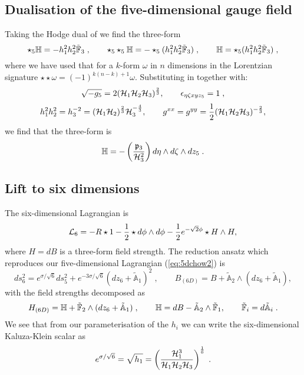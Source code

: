 \subsection*{Dualisation of the five-dimensional gauge field}
Taking the Hodge dual of  we find the three-form
\begin{equation*}
        \star_5 \mathbb{H} = - h^2_1 h^2_2 \tilde{\mathbb F}_3 \;,\qquad
        \star_5 \star_5 \mathbb{H} = - \star_5(h^2_1 h^2_2 \tilde{\mathbb F}_3) \;, \qquad
        \mathbb{H} = \star_5(h^2_1 h^2_2 \tilde{\mathbb F}_3) \;,
\end{equation*}
where we have used that for a $k$-form $\omega$ in $n$ dimensions in the Lorentzian signature $\star \star \omega = (-1)^{k(n-k)+1} \omega$. Substituting in  together with:
\begin{equation*}
    \sqrt{-g_5} = 2 ({\cal H}_1 {\cal H}_2 {\cal H}_3)^{\frac{2}{3}}
, \qquad \epsilon_{\eta \zeta x y z_5} = 1 \;,
\end{equation*}
\begin{equation*}
    h_1^2 h_2^2 = h_3^{-2} = ({\cal H}_1 {\cal H}_2)^{\frac{2}{3}} {\cal H}_3^{-\frac{4}{3}}, \qquad g^{xx} = g^{yy} = \frac{1}{2}({\cal H}_1 {\cal H}_2 {\cal H}_3)^{-\frac{2}{3}},
\end{equation*}
we find that the three-form is
\begin{equation*}
        \mathbb{H} = -\left( \frac{ \mathfrak{p}_3}{{\cal H}_3^2} \right) d\eta \wedge d\zeta \wedge dz_5 \;.
\end{equation*}

\subsection*{Lift to six dimensions}

The six-dimensional Lagrangian is
\begin{equation*}
    {\cal L}_6 = - R\star 1 - \frac{1}{2} \star d\phi \wedge d\phi - \frac{1}{2} e^{-\sqrt{2}\phi} \star H \wedge H,
\end{equation*}
where $H = dB$ is a three-form field strength. The reduction ansatz which
reproduces our five-dimensional Lagrangian (\ref{eq:5dchow2}) is
\begin{equation*}
    ds^2_6 = e^{\sigma/\sqrt{6}} ds_5^2 + e^{-3\sigma/\sqrt{6}} (dz_6 + \tilde{\mathbb{A}}_1)^2 \;,\qquad B_{(6D)} = B + \tilde{\mathbb{A}}_2 \wedge (dz_6 + \tilde{\mathbb{A}}_1),
\end{equation*}
with the field strengths decomposed as
\begin{equation*}
H_{(6D)} = \mathbb{H} + \tilde{\mathbb F}_2 \wedge (dz_6 + \tilde{\mathbb{A}}_1) \;,    \qquad \mathbb{H} = dB - \tilde{\mathbb{A}}_2 \wedge \tilde{\mathbb F}_1 ,\qquad \tilde{\mathbb F}_i = d \tilde{\mathbb{A}}_i \;.
\end{equation*}
We see that from our parameterisation of the $h_i$ we can write the six-dimensional Kaluza-Klein scalar as
\begin{equation*}
    e^{\sigma/\sqrt{6}} = \sqrt{h_1} = \left( \frac{{\cal H}_1^3}{{\cal H}_1 {\cal H}_2 {\cal H}_3} \right)^{\frac{1}{6}} \;.
\end{equation*}

